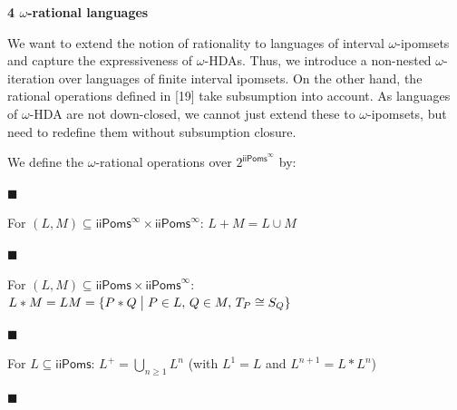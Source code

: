 \documentclass[10pt,a4paper]{article}
\begin{document}
 
 
 


 
\par\medskip\noindent\textbf{4 $\omega$-rational languages}\par
 
 
We want to extend the notion of rationality to languages of interval $\omega$-ipomsets and capture the expressiveness of $\omega$-HDAs. Thus, we introduce a non-nested $\omega$-iteration over languages of finite interval ipomsets. On the other hand, the rational operations defined in [19] take subsumption into account. As languages of $\omega$-HDA are not down-closed, we cannot just extend these to $\omega$-ipomsets, but need to redefine them without subsumption closure.\par
 
 
 
We define the $\omega$-rational operations over $2^{\mathsf{iiPoms}^{\infty}}$ by:\par
  
\par\noindent  $\blacksquare$ 
 
For $(L,M)\subseteq{\mathsf{iiPoms}^{\infty}}\times{\mathsf{iiPoms}^{\infty}}$: $L+M=L\cup M$\par
 
 
 
\par\noindent  $\blacksquare$ 
 
For $(L,M)\subseteq\mathsf{iiPoms}\times{\mathsf{iiPoms}^{\infty}}$: $L*M=LM={\{P*Q\mathrel{\big{|}}P\in L,\,Q\in M,\,T_{P}\cong S_{Q}\}}$\par
 
 
 
\par\noindent  $\blacksquare$ 
 
For $L\subseteq\mathsf{iiPoms}$: $L^{+}=\bigcup_{n\geqslant 1}L^{n}$ (with $L^{1}=L$ and $L^{n+1}=L*L^{n}$)\par
 
 
 
\par\noindent  $\blacksquare$ 
 
\end{document}
